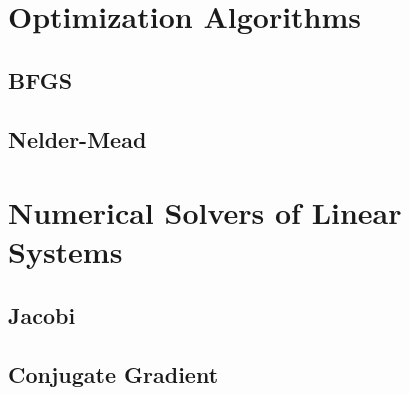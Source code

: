     

\section{Optimization Algorithms}\label{optimalgorithms}
\subsection{BFGS}\label{bfgs}
\subsection{Nelder-Mead}\label{neldermead}
\section{Numerical Solvers of Linear Systems}\label{linsys_solvers}
\subsection{Jacobi} \label{jacobi}
\subsection{Conjugate Gradient}\label{cg}






















